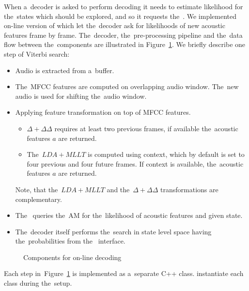 When a~decoder is asked to perform decoding it needs to estimate likelihood for the~states which should be explored, and so it requests the~.
We implemented on-line version of  which let the~decoder ask for likelihoods of new acoustic features frame by frame.
The~decoder, the~pre-processing pipeline and the~data flow between the~components are illustrated in Figure~\ref{fig:online_pipeline}.
We briefly describe one step of Viterbi search:
\begin{itemize}
    \item Audio is extracted from a~buffer. 
    \item The~\ac{MFCC} features are computed on overlapping audio window. The~new audio is used for shifting the~audio window.
    \item Applying feature transformation on top of \ac{MFCC} features. 
        \begin{itemize}
            \item $\Delta + \Delta\Delta$ requires at least two previous frames, if available the~acoustic features $a$ are returned. 
            \item The~$LDA+MLLT$ is computed using context, which by default is set to four previous and four future frames. If context is available, the~acoustic features $a$ are returned.
        \end{itemize}
        Note, that the~$LDA+MLLT$ and the~$\Delta+\Delta\Delta$ transformations are complementary.
    \item The~ queries the~\ac{AM} for the~likelihood of acoustic features and given state.
    \item The~decoder itself performs the~search in state level space having the~probabilities from the~ interface. 
\end{itemize}

\begin{figure}[!htp]
    \begin{center}
        
        \caption{Components for on-line decoding}
    \label{fig:online_pipeline} 
    \end{center}
\end{figure}

Each step in~Figure~\ref{fig:online_pipeline} is implemented as a~separate C++ class.
 instantiate each class during the~setup.


